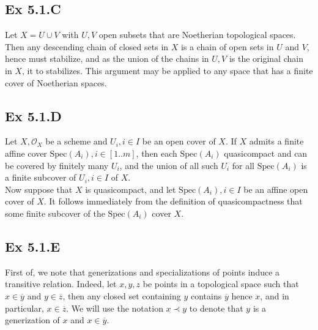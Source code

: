 \documentclass{article}
\theoremstyle{definition}
\newcommand{\Spec}{\text{Spec}}
\begin{document}
\subsection*{Ex 5.1.C}

Let $X = U \cup V$ with $U, V$ open subsets that are Noetherian topological
spaces. Then any descending chain of closed sets in $X$ is a chain of open sets
in $U$ and $V$, hence must stabilize, and as the union of the chains in $U, V$
is the original chain in $X$, it to stabilizes. This argument may be applied to
any space that has a finite cover of Noetherian spaces.

\subsection*{Ex 5.1.D}

Let $X, \mathcal{O}_X$ be a scheme and $U_i, i \in I$ be an open cover of $X$.
If $X$ admits a finite affine cover $\Spec(A_i), i \in [1..m]$, then each
$\Spec(A_i)$ quasicompact and can be covered by finitely many $U_i$, and the
union of all such $U_i$ for all $\Spec(A_i)$ is a finite subcover of $U_i,i \in
	I$ of $X$. \\

Now suppose that $X$ is quasicompact, and let $\Spec(A_i), i \in I$ be an
affine open cover of $X$. It follows immediately from the definition of
quasicompactness that some finite subcover of the $\Spec(A_i)$ cover $X$.

\subsection*{Ex 5.1.E}

First of, we note that generizations and specializations of points induce a
transitive relation. Indeed, let $x, y, z$ be points in a topological space
such that $x \in \overline{y}$ and $y \in \overline{z}$, then any closed set
containing $y$ contains $\overline{y}$ hence $x$, and in particular, $x \in
	\overline{z}$. We will use the notation $x \prec y$ to denote that $y$ is a
generization of $x$ and $x \in \overline{y}$.\\
\end{document}
